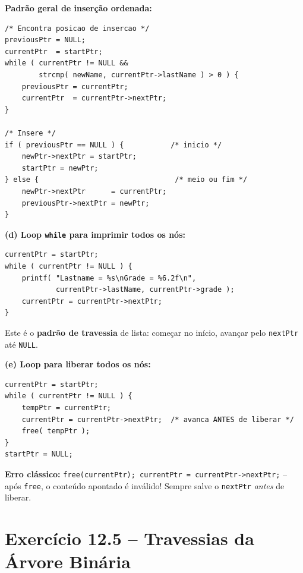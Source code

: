 \documentclass[12pt,a4paper]{article}
\begin{document}
\begin{respostabox}
\textbf{Padrão geral de inserção ordenada:}
\begin{lstlisting}
/* Encontra posicao de insercao */
previousPtr = NULL;
currentPtr  = startPtr;
while ( currentPtr != NULL &&
        strcmp( newName, currentPtr->lastName ) > 0 ) {
    previousPtr = currentPtr;
    currentPtr  = currentPtr->nextPtr;
}

/* Insere */
if ( previousPtr == NULL ) {           /* inicio */
    newPtr->nextPtr = startPtr;
    startPtr = newPtr;
} else {                                /* meio ou fim */
    newPtr->nextPtr      = currentPtr;
    previousPtr->nextPtr = newPtr;
}
\end{lstlisting}

\textbf{(d) Loop \texttt{while} para imprimir todos os nós:}
\begin{lstlisting}
currentPtr = startPtr;
while ( currentPtr != NULL ) {
    printf( "Lastname = %s\nGrade = %6.2f\n",
            currentPtr->lastName, currentPtr->grade );
    currentPtr = currentPtr->nextPtr;
}
\end{lstlisting}

Este é o \textbf{padrão de travessia} de lista: começar no início, avançar pelo
\texttt{nextPtr} até \texttt{NULL}.

\textbf{(e) Loop para liberar todos os nós:}
\begin{lstlisting}
currentPtr = startPtr;
while ( currentPtr != NULL ) {
    tempPtr = currentPtr;
    currentPtr = currentPtr->nextPtr;  /* avanca ANTES de liberar */
    free( tempPtr );
}
startPtr = NULL;
\end{lstlisting}

\begin{erroco}
  \textbf{Erro clássico:} \texttt{free(currentPtr); currentPtr = currentPtr->nextPtr;}
  -- após \texttt{free}, o conteúdo apontado é inválido! Sempre salve o
  \texttt{nextPtr} \textit{antes} de liberar.
\end{erroco}
\end{respostabox}

\newpage

\section{Exercício 12.5 -- Travessias da Árvore Binária}
\end{document}
